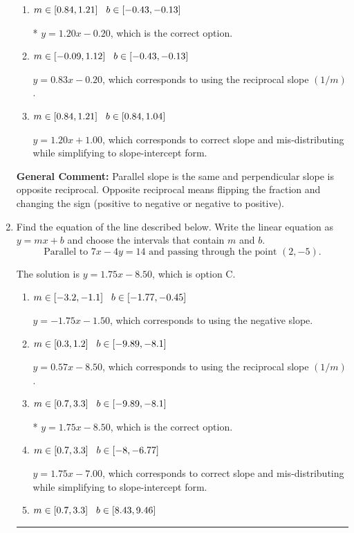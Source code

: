 \documentclass{extbook}[14pt]
\newcommand{\litem}[1]{\item #1

\rule{\textwidth}{0.4pt}}
\begin{document}
\begin{enumerate}
{\begin{enumerate}[label=\Alph*.]
 $y = -1.20x + 14.20$, which corresponds to using the negative slope.
\item \( m \in [0.84, 1.21] \hspace*{3mm} b \in [-0.43, -0.13] \)

* $y = 1.20x - 0.20$, which is the correct option.
\item \( m \in [-0.09, 1.12] \hspace*{3mm} b \in [-0.43, -0.13] \)

 $y = 0.83x - 0.20$, which corresponds to using the reciprocal slope $(1/m)$.
\item \( m \in [0.84, 1.21] \hspace*{3mm} b \in [0.84, 1.04] \)

 $y = 1.20x + 1.00$, which corresponds to correct slope and mis-distributing while simplifying to slope-intercept form.
\end{enumerate}

\textbf{General Comment:} Parallel slope is the same and perpendicular slope is opposite reciprocal. Opposite reciprocal means flipping the fraction and changing the sign (positive to negative or negative to positive).
}
\litem{
Find the equation of the line described below. Write the linear equation as $ y=mx+b $ and choose the intervals that contain $m$ and $b$.
\[ \text{Parallel to } 7 x - 4 y = 14 \text{ and passing through the point } (2, -5). \]

The solution is \( y = 1.75x - 8.50 \), which is option C.\begin{enumerate}[label=\Alph*.]
\item \( m \in [-3.2, -1.1] \hspace*{3mm} b \in [-1.77, -0.45] \)

 $y = -1.75x - 1.50$, which corresponds to using the negative slope.
\item \( m \in [0.3, 1.2] \hspace*{3mm} b \in [-9.89, -8.1] \)

 $y = 0.57x - 8.50$, which corresponds to using the reciprocal slope $(1/m)$.
\item \( m \in [0.7, 3.3] \hspace*{3mm} b \in [-9.89, -8.1] \)

* $y = 1.75x - 8.50$, which is the correct option.
\item \( m \in [0.7, 3.3] \hspace*{3mm} b \in [-8, -6.77] \)

 $y = 1.75x - 7.00$, which corresponds to correct slope and mis-distributing while simplifying to slope-intercept form.
\item \( m \in [0.7, 3.3] \hspace*{3mm} b \in [8.43, 9.46] \)


\end{enumerate}}
\end{enumerate}
\end{document}
